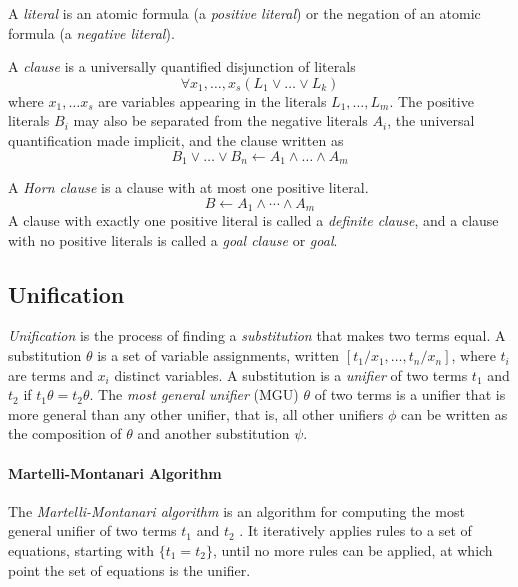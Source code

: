 \begin{definition}
A \emph{literal} is an atomic formula (a \emph{positive literal}) or the negation of an atomic formula (a \emph{negative literal}).
\end{definition}

\begin{definition}
A \emph{clause} is a universally quantified disjunction of literals
$$
\forall x_1, \ldots, x_s (L_1 \lor \ldots \lor L_k)
$$
where $x_1, \ldots x_s$ are variables appearing in the literals $L_1, \ldots, L_m$. The positive literals $B_i$ may also be separated from the negative literals $A_i$, the universal quantification made implicit, and the clause written as
$$
B_1 \lor \ldots \lor B_n \leftarrow A_1 \land \ldots \land A_m
$$
\end{definition}

\begin{definition}
A \emph{Horn clause} is a clause with at most one positive literal.
$$
B \leftarrow A_1 \land \cdots \land A_m
$$
A clause with exactly one positive literal is called a \emph{definite clause}, and a clause with no positive literals is called a \emph{goal clause} or \emph{goal}.
\end{definition}

\subsection{Unification}

\emph{Unification} is the process of finding a \emph{substitution} that makes two terms equal. A substitution $\theta$ is a set of variable assignments, written $[t_1/x_1, \ldots, t_n/x_n]$, where $t_i$ are terms and $x_i$ distinct variables. A substitution is a \emph{unifier} of two terms $t_1$ and $t_2$ if $t_1\theta = t_2\theta$. The \emph{most general unifier} (MGU) $\theta$ of two terms is a unifier that is more general than any other unifier, that is, all other unifiers $\phi$ can be written as the composition of $\theta$ and another substitution $\psi$.

\paragraph{Martelli-Montanari Algorithm}

The \emph{Martelli-Montanari algorithm} is an algorithm for computing the most general unifier of two terms $t_1$ and $t_2$ \cite{martelliEfficientUnificationAlgorithm1982}. It iteratively applies rules to a set of equations, starting with $\{t_1 = t_2\}$, until no more rules can be applied, at which point the set of equations is the unifier.

